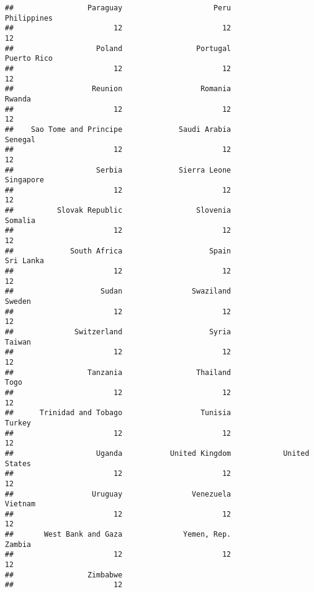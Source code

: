 \documentclass[
]{book}
\newenvironment{Shaded}{\begin{snugshade}}{\end{snugshade}}
\newcommand{\CommentTok}[1]{\textcolor[rgb]{0.56,0.35,0.01}{\textit{#1}}}
\newcommand{\KeywordTok}[1]{\textcolor[rgb]{0.13,0.29,0.53}{\textbf{#1}}}
\newcommand{\NormalTok}[1]{#1}
\newcommand{\OperatorTok}[1]{\textcolor[rgb]{0.81,0.36,0.00}{\textbf{#1}}}
\begin{document}
\begin{verbatim}
##                 Paraguay                     Peru              Philippines 
##                       12                       12                       12 
##                   Poland                 Portugal              Puerto Rico 
##                       12                       12                       12 
##                  Reunion                  Romania                   Rwanda 
##                       12                       12                       12 
##    Sao Tome and Principe             Saudi Arabia                  Senegal 
##                       12                       12                       12 
##                   Serbia             Sierra Leone                Singapore 
##                       12                       12                       12 
##          Slovak Republic                 Slovenia                  Somalia 
##                       12                       12                       12 
##             South Africa                    Spain                Sri Lanka 
##                       12                       12                       12 
##                    Sudan                Swaziland                   Sweden 
##                       12                       12                       12 
##              Switzerland                    Syria                   Taiwan 
##                       12                       12                       12 
##                 Tanzania                 Thailand                     Togo 
##                       12                       12                       12 
##      Trinidad and Tobago                  Tunisia                   Turkey 
##                       12                       12                       12 
##                   Uganda           United Kingdom            United States 
##                       12                       12                       12 
##                  Uruguay                Venezuela                  Vietnam 
##                       12                       12                       12 
##       West Bank and Gaza              Yemen, Rep.                   Zambia 
##                       12                       12                       12 
##                 Zimbabwe 
##                       12
\end{verbatim}

\begin{Shaded}
\end{Shaded}
\end{document}
